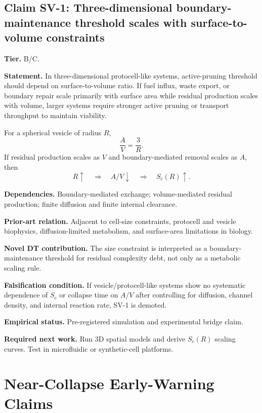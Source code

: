 \documentclass[10pt,a4paper,twocolumn,aps,prl]{revtex4-2}
\theoremstyle{claimstyle}
\theoremstyle{definition}
\newcommand{\claimfield}[1]{\noindent\textbf{#1.}}
\begin{document}
\subsection{Claim SV-1: Three-dimensional boundary-maintenance threshold scales with surface-to-volume constraints}

\claimfield{Tier} B/C.

\claimfield{Statement} In three-dimensional protocell-like systems, active-pruning threshold should depend on surface-to-volume ratio. If fuel influx, waste export, or boundary repair scale primarily with surface area while residual production scales with volume, larger systems require stronger active pruning or transport throughput to maintain viability.

For a spherical vesicle of radius $R$,
\begin{equation}
\frac{A}{V}=\frac{3}{R}.
\end{equation}
If residual production scales as $V$ and boundary-mediated removal scales as $A$, then
\begin{equation}
R\uparrow \quad \Rightarrow \quad A/V\downarrow \quad \Rightarrow \quad S_c(R)\uparrow.
\end{equation}

\claimfield{Dependencies} Boundary-mediated exchange; volume-mediated residual production; finite diffusion and finite internal clearance.

\claimfield{Prior-art relation} Adjacent to cell-size constraints, protocell and vesicle biophysics, diffusion-limited metabolism, and surface-area limitations in biology.

\claimfield{Novel DT contribution} The size constraint is interpreted as a boundary-maintenance threshold for residual complexity debt, not only as a metabolic scaling rule.

\claimfield{Falsification condition} If vesicle/protocell-like systems show no systematic dependence of $S_c$ or collapse time on $A/V$ after controlling for diffusion, channel density, and internal reaction rate, SV-1 is demoted.

\claimfield{Empirical status} Pre-registered simulation and experimental bridge claim.

\claimfield{Required next work} Run 3D spatial models and derive $S_c(R)$ scaling curves. Test in microfluidic or synthetic-cell platforms.

\section{Near-Collapse Early-Warning Claims}
\end{document}
